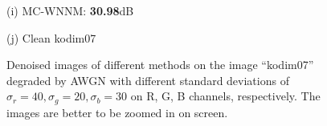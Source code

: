 \documentclass[10pt,onecolumn,letterpaper]{article}
\begin{document}
\begin{figure}
{\begin{minipage}[t]{0.195\textwidth}
{\footnotesize (i) MC-WNNM: \textbf{30.98}dB}
\end{minipage}
\begin{minipage}[t]{0.195\textwidth}
\centering
{}
{\footnotesize (j) Clean kodim07}
\end{minipage}
}
\caption{Denoised images of different methods on the image ``kodim07'' degraded by AWGN with different standard deviations of $\sigma_{r}=40, \sigma_{g}=20, \sigma_{b}=30$ on R, G, B channels, respectively. The images are better to be zoomed in on screen.}
\label{f1}
\vspace{2mm}
\end{figure}
\end{document}
